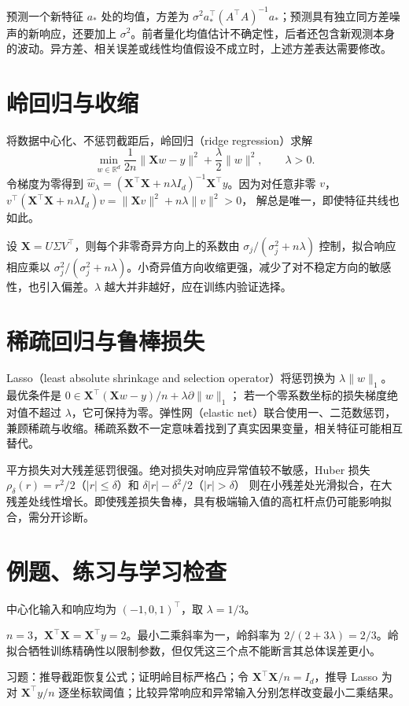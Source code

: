 预测一个新特征 $a_*$ 处的均值，方差为 $\sigma^2a_*^\top(A^\top A)^{-1}a_*$；预测具有独立同方差噪声的新响应，还要加上 $\sigma^2$。前者量化均值估计不确定性，后者还包含新观测本身的波动。异方差、相关误差或线性均值假设不成立时，上述方差表达需要修改。

\section{岭回归与收缩}

将数据中心化、不惩罚截距后，岭回归（ridge regression）求解
\begin{equation}
 \min_{w\in\mathbb R^d}\frac1{2n}\|\mathbf Xw-y\|^2
   +\frac\lambda2\|w\|^2,\qquad\lambda>0.
 \label{eq:ml-ridge}
\end{equation}
令梯度为零得到 $\widehat w_\lambda=(\mathbf X^\top\mathbf X+n\lambda I_d)^{-1}\mathbf X^\top y$。因为对任意非零 $v$，
$v^\top(\mathbf X^\top\mathbf X+n\lambda I_d)v=\|\mathbf Xv\|^2+n\lambda\|v\|^2>0$，
解总是唯一，即使特征共线也如此。

设 $\mathbf X=U\Sigma V^\top$，则每个非零奇异方向上的系数由 $\sigma_j/(\sigma_j^2+n\lambda)$ 控制，拟合响应相应乘以 $\sigma_j^2/(\sigma_j^2+n\lambda)$。小奇异值方向收缩更强，减少了对不稳定方向的敏感性，也引入偏差。$\lambda$ 越大并非越好，应在训练内验证选择。

\section{稀疏回归与鲁棒损失}

Lasso（least absolute shrinkage and selection operator）将惩罚换为 $\lambda\|w\|_1$。最优条件是
$0\in\mathbf X^\top(\mathbf Xw-y)/n+\lambda\partial\|w\|_1$；
若一个零系数坐标的损失梯度绝对值不超过 $\lambda$，它可保持为零。弹性网（elastic net）联合使用一、二范数惩罚，兼顾稀疏与收缩。稀疏系数不一定意味着找到了真实因果变量，相关特征可能相互替代。

平方损失对大残差惩罚很强。绝对损失对响应异常值较不敏感，Huber 损失
$\rho_\delta(r)=r^2/2$（$|r|\leq\delta$）和
$\delta|r|-\delta^2/2$（$|r|>\delta$）
则在小残差处光滑拟合，在大残差处线性增长。即使残差损失鲁棒，具有极端输入值的高杠杆点仍可能影响拟合，需分开诊断。

\section{例题、练习与学习检查}

\begin{example}[一维岭收缩]
中心化输入和响应均为 $(-1,0,1)^\top$，取 $\lambda=1/3$。
\end{example}
\begin{solve}
$n=3$，$\mathbf X^\top\mathbf X=\mathbf X^\top y=2$。最小二乘斜率为一，岭斜率为 $2/(2+3\lambda)=2/3$。岭拟合牺牲训练精确性以限制参数，但仅凭这三个点不能断言其总体误差更小。
\end{solve}

习题：推导截距恢复公式；证明岭目标严格凸；令 $\mathbf X^\top\mathbf X/n=I_d$，推导 Lasso 为对 $\mathbf X^\top y/n$ 逐坐标软阈值；比较异常响应和异常输入分别怎样改变最小二乘结果。





